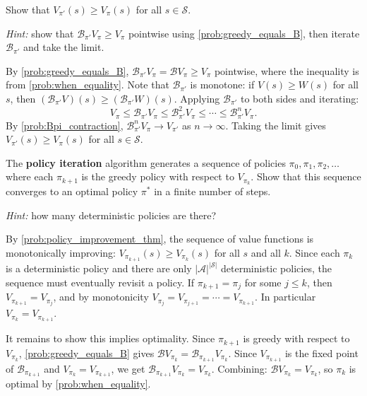 \documentclass[11pt]{article}
\newcommand{\cS}{\mathcal{S}}
\newcommand{\cA}{\mathcal{A}}
\begin{document}
\begin{exercise}
\label{prob:policy_improvement_thm} Show that $V_{\pi'}(s) \ge V_\pi(s)$ for all $s \in \cS$.

\textit{Hint:} show that $\mathcal{B}_{\pi'} V_\pi \ge V_\pi$ pointwise using \cref{prob:greedy_equals_B}, then iterate $\mathcal{B}_{\pi'}$ and take the limit.
\end{exercise}

\begin{solution}
By \cref{prob:greedy_equals_B}, $\mathcal{B}_{\pi'} V_\pi = \mathcal{B} V_\pi \ge V_\pi$ pointwise, where the inequality is from \cref{prob:when_equality}. Note that $\mathcal{B}_{\pi'}$ is monotone: if $V(s) \ge W(s)$ for all $s$, then $(\mathcal{B}_{\pi'} V)(s) \ge (\mathcal{B}_{\pi'} W)(s)$. Applying $\mathcal{B}_{\pi'}$ to both sides and iterating:
$$
V_\pi \le \mathcal{B}_{\pi'} V_\pi \le \mathcal{B}_{\pi'}^2 V_\pi \le \cdots \le \mathcal{B}_{\pi'}^n V_\pi.
$$
By \cref{prob:Bpi_contraction}, $\mathcal{B}_{\pi'}^n V_\pi \to V_{\pi'}$ as $n \to \infty$. Taking the limit gives $V_{\pi'}(s) \ge V_\pi(s)$ for all $s \in \cS$.
\end{solution}

\begin{exercise}
\label{prob:policy_iteration} The \textbf{policy iteration} algorithm generates a sequence of policies $\pi_0, \pi_1, \pi_2, \ldots$ where each $\pi_{k+1}$ is the greedy policy with respect to $V_{\pi_k}$. Show that this sequence converges to an optimal policy $\pi^*$ in a finite number of steps.

\textit{Hint:} how many deterministic policies are there?
\end{exercise}

\begin{solution}
By \cref{prob:policy_improvement_thm}, the sequence of value functions is monotonically improving: $V_{\pi_{k+1}}(s) \ge V_{\pi_k}(s)$ for all $s$ and all $k$. Since each $\pi_k$ is a deterministic policy and there are only $|\cA|^{|\cS|}$ deterministic policies, the sequence must eventually revisit a policy. If $\pi_{k+1} = \pi_j$ for some $j \le k$, then $V_{\pi_{k+1}} = V_{\pi_j}$, and by monotonicity $V_{\pi_j} = V_{\pi_{j+1}} = \cdots = V_{\pi_{k+1}}$. In particular $V_{\pi_k} = V_{\pi_{k+1}}$.

It remains to show this implies optimality. Since $\pi_{k+1}$ is greedy with respect to $V_{\pi_k}$, \cref{prob:greedy_equals_B} gives $\mathcal{B} V_{\pi_k} = \mathcal{B}_{\pi_{k+1}} V_{\pi_k}$. Since $V_{\pi_{k+1}}$ is the fixed point of $\mathcal{B}_{\pi_{k+1}}$ and $V_{\pi_k} = V_{\pi_{k+1}}$, we get $\mathcal{B}_{\pi_{k+1}} V_{\pi_k} = V_{\pi_k}$. Combining: $\mathcal{B} V_{\pi_k} = V_{\pi_k}$, so $\pi_k$ is optimal by \cref{prob:when_equality}.
\end{solution}
\end{document}
